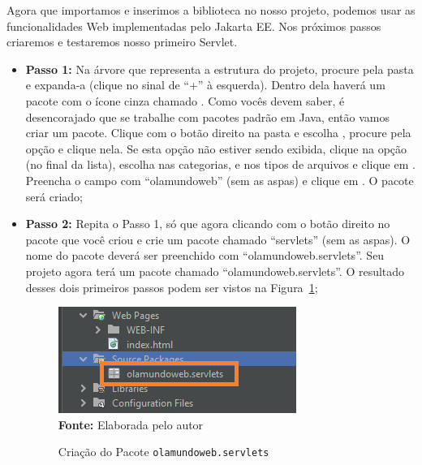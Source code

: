 Agora que importamos e inserimos a biblioteca  no nosso projeto, podemos usar as funcionalidades Web implementadas pelo Jakarta EE. Nos próximos passos criaremos e testaremos nosso primeiro Servlet.

\begin{itemize}
    
    \item \textbf{Passo 1:} Na árvore que representa a estrutura do projeto, procure pela pasta  e expanda-a (clique no sinal de ``+'' à esquerda). Dentro dela haverá um pacote com o ícone cinza chamado . Como vocês devem saber, é desencorajado que se trabalhe com pacotes padrão em Java, então vamos criar um pacote. Clique com o botão direito na pasta  e escolha , procure pela opção  e clique nela. Se esta opção não estiver sendo exibida, clique na opção  (no final da lista), escolha  nas categorias, e  nos tipos de arquivos e clique em . Preencha o campo  com ``olamundoweb'' (sem as aspas) e clique em . O pacote será criado;
        
    \item \textbf{Passo 2:} Repita o Passo 1, só que agora clicando com o botão direito no pacote que você criou e crie um pacote chamado ``servlets'' (sem as aspas). O nome do pacote deverá ser preenchido com ``olamundoweb.servlets''. Seu projeto agora terá um pacote chamado ``olamundoweb.servlets''. O resultado desses dois primeiros passos podem ser vistos na Figura~\ref{fig:cap01CriacaoPacote};
    
    \FloatBarrier
    \begin{figure}[!htbp]
        \centering
        \caption{Criação do Pacote \texttt{olamundoweb.servlets}}
        \includegraphics[scale=0.9]{imagens/cap01CriacaoPacote}
        \\\textbf{Fonte:} Elaborada pelo autor
        \label{fig:cap01CriacaoPacote}
    \end{figure}
    \FloatBarrier
            

\end{itemize}

